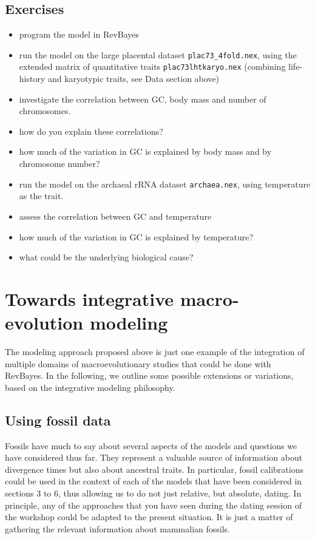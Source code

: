 \documentclass[usletter]{article}
\newcommand{\cmd}[1]{\texttt{#1}}
\begin{document}
\subsection*{Exercises}

\begin{itemize}
\item
program the model in RevBayes
\item
run the model on the large placental dataset \cmd{plac73\_4fold.nex},
using the extended matrix of quantitative traits \cmd{plac73lhtkaryo.nex} (combining life-history and karyotypic traits, see Data section above)
\item
investigate the correlation between GC, body mass and number of chromosomes. 
\item
how do you explain these correlations?
\item
how much of the variation in GC is explained by body mass and by chromosome number?
\item
run the model on the archaeal rRNA dataset \cmd{archaea.nex}, using temperature as the trait.
\item
assess the correlation between GC and temperature
\item
how much of the variation in GC is explained by temperature?
\item
what could be the underlying biological cause?
\end{itemize}


\section{Towards integrative macro-evolution modeling}

The modeling approach proposed above is just one example of the integration of multiple domains of macroevolutionary studies that could be done with RevBayes.
In the following, we outline some possible extensions or variations, based on the integrative modeling philosophy.

\subsection*{Using fossil data}

Fossils have much to say about several aspects of the models and questions we have considered thus far.
They represent a valuable source of information about divergence times but also about ancestral traits.
In particular, fossil calibrations could be used in the context of each of the models that have been considered in sections 3 to 6, thus allowing us to do not just relative, but absolute, dating. In principle, any of the approaches that you have seen during the dating session of the workshop could be adapted to the present situation. It is just a matter of gathering the relevant information about mammalian fossils.
\end{document}
